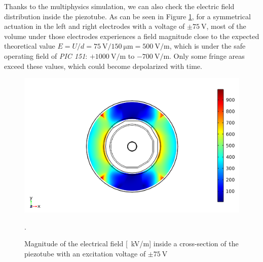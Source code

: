 Thanks to the multiphysics simulation, we can also check the electric field distribution inside the piezotube. As can be seen in Figure \ref{fig:field}, for a symmetrical actuation in the left and right electrodes with a voltage of $\pm \SI{75}{\volt}$, most of the volume under those electrodes experiences a field magnitude close to the expected theoretical value $E=U/d = \SI{75}{\volt}/\SI{150}{\micro\meter} = \SI{500}{\volt/\meter}$, which is under the safe operating field of \textit{PIC 151}: $ +\SI{1000}{\volt/\meter}$ to $ -\SI{700}{\volt/\meter}$. Only some fringe areas exceed these values, which could become depolarized with time.
\begin{figure}[h!]\centering
      \includegraphics[width=10 cm]{figures/30_DesignSimulation/Mechanical/field.png}
      \caption{Magnitude of the electrical field [\SI{}{\kilo \volt / \meter}] inside a cross-section of the piezotube with an excitation voltage of $\pm \SI{75}{\volt}$}.
      \label{fig:field}
\end{figure}





